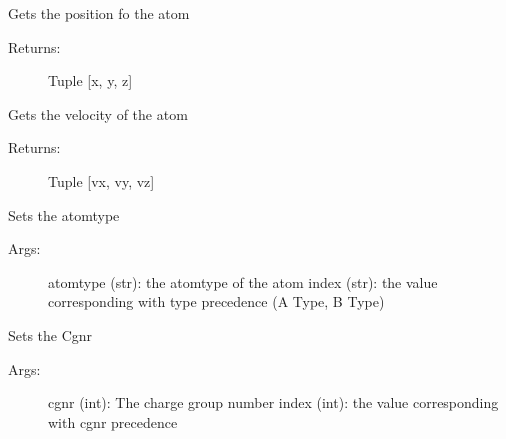 \documentclass[letterpaper,10pt,english]{sphinxmanual}
\begin{document}
\begin{fulllineitems}

\begin{fulllineitems}
\label{atom:ctools.Atom.Atom.getPosition}
Gets the position fo the atom
\begin{description}
\item[{Returns:}] \leavevmode
Tuple {[}x, y, z{]}

\end{description}

\end{fulllineitems}



\begin{fulllineitems}
\label{atom:ctools.Atom.Atom.getSigma}
\end{fulllineitems}



\begin{fulllineitems}
\label{atom:ctools.Atom.Atom.getVelocity}
Gets the velocity of the atom
\begin{description}
\item[{Returns:}] \leavevmode
Tuple {[}vx, vy, vz{]}

\end{description}

\end{fulllineitems}



\begin{fulllineitems}
\label{atom:ctools.Atom.Atom.setAtomType}
Sets the atomtype
\begin{description}
\item[{Args:}] \leavevmode
atomtype (str): the atomtype of the atom
index (str): the value corresponding with type precedence (A Type, B Type)

\end{description}

\end{fulllineitems}



\begin{fulllineitems}
\label{atom:ctools.Atom.Atom.setCgnr}
Sets the Cgnr
\begin{description}
\item[{Args:}] \leavevmode
cgnr (int): The charge group number
index (int): the value corresponding with cgnr precedence


\end{description}
\end{fulllineitems}
\end{fulllineitems}
\end{document}
